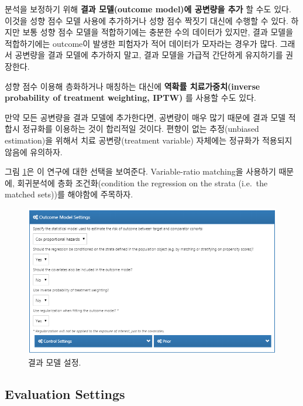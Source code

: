 \documentclass[11pt]{book}
\theoremstyle{definition}
\theoremstyle{definition}
\theoremstyle{definition}
\theoremstyle{remark}
\begin{document}
분석을 보정하기 위해 \textbf{결과 모델(outcome model)에 공변량을 추가}
할 수도 있다. 이것을 성향 점수 모델 사용에 추가하거나 성향 점수 짝짓기
대신에 수행할 수 있다. 하지만 보통 성향 점수 모델을 적합하기에는 충분한
수의 데이터가 있지만, 결과 모델을 적합하기에는 outcome이 발생한 피험자가
적어 데이터가 모자라는 경우가 많다. 그래서 공변량을 결과 모델에 추가하지
말고, 결과 모델을 가급적 간단하게 유지하기를 권장한다.

성향 점수 이용해 층화하거나 매칭하는 대신에 \textbf{역확률
치료가중치(inverse probability of treatment weighting, IPTW)} 를 사용할
수도 있다.

만약 모든 공변량을 결과 모델에 추가한다면, 공변량이 매우 많기 때문에
결과 모델 적합시 정규화를 이용하는 것이 합리적일 것이다. 편향이 없는
추정(unbiased estimation)을 위해서 치료 공변량(treatment variable)
자체에는 정규화가 적용되지 않음에 유의하자.

그림 \ref{fig:outcomeModelSettings}은 이 연구에 대한 선택을 보여준다.
Variable-ratio matching을 사용하기 때문에, 회귀분석에 층화
조건화(condition the regression on the strata (i.e.~the matched sets))를
해야함에 주목하자.

\begin{figure}

{\centering \includegraphics[width=1\linewidth]{images/PopulationLevelEstimation/outcomeModelSettings} 

}

\caption{결과 모델 설정.}\label{fig:outcomeModelSettings}
\end{figure}

\subsection{Evaluation Settings}\label{evaluationSettings}
\end{document}
